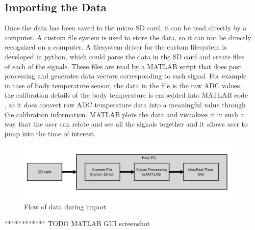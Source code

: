\subsection{Importing the Data}
Once the data has been saved to the micro SD card, it can be read directly by a computer. A custom file system is used to store the data, so it can not be directly recognized on a computer. A filesystem driver for the custom filesystem is developed in python, which could parse the data in the SD card and create files of each of the signals. These files are read by a MATLAB script that does post processing and generates data vectors corresponding to each signal. For example in case of body temperature sensor, the data in the file is the raw ADC values, the calibration details of the body temperature is embedded into MATLAB code , so it does convert raw ADC temperature  data into a meaningful value through the calibration information.  
MATLAB plots the data and visualizes it in such a way that the user can relate and see all the signals together and it allows user to jump into the time of interest. 
 \begin{figure}[h]
	\centering
	\includegraphics[scale = 0.5 ]{play_dataflow.JPG}
	\caption{Flow of data during import \label{play_dataflow}}
\end{figure}

************
TODO MATLAB GUI screenshot
